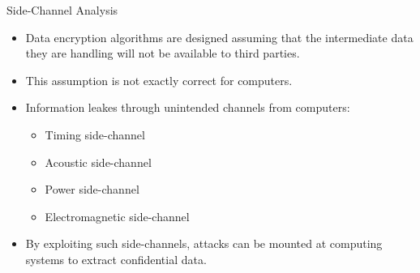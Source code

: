\documentclass[handout]{beamer}
\begin{document}
\begin{frame}{Side-Channel Analysis}

\begin{itemize}
\footnotesize

\item Data encryption algorithms are designed assuming that the intermediate data they are handling will not be available to third parties.

\vspace{10pt}

\item This assumption is not exactly correct for computers.

\vspace{10pt}

\item Information leakes through unintended channels from computers:
	\begin{itemize}
	\footnotesize
	\item Timing side-channel
	\item Acoustic side-channel
	\item Power side-channel
	\item Electromagnetic side-channel
	\end{itemize}

\vspace{10pt}

\item By exploiting such side-channels, attacks can be mounted at computing systems to extract confidential data.


\end{itemize}

\end{frame}
\end{document}
